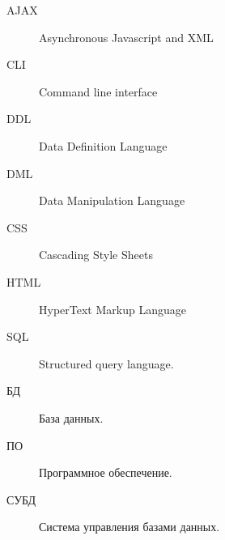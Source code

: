 \Abbreviations %
\begin{description}
\item [AJAX] Asynchronous Javascript and XML
\item [CLI] Command line interface
\item [DDL] Data Definition Language
\item [DML] Data Manipulation Language
\item [CSS] Cascading Style Sheets
\item [HTML] HyperText Markup Language
\item[SQL] Structured query language.
\item[БД] База данных.
\item[ПО] Программное обеспечение.
\item[СУБД] Система управления базами данных.

\end{description}

